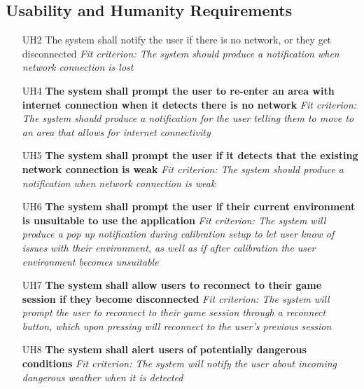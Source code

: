 \documentclass{article}
\begin{document}
\subsection{Usability and Humanity Requirements}
\begin{enumerate}
    \item[UH2] The system shall notify the user if there is no network, or they get disconnected\newline
    \textit{Fit criterion: The system should produce a notification when network connection is lost}
    \item[UH4] \textbf{The system shall prompt the user to re-enter an area with internet connection when it detects there is no network}\newline
    \textit{Fit criterion: The system should produce a notification for the user telling them to move to an area that allows for internet connectivity}
    \item[UH5] \textbf{The system shall prompt the user if it detects that the existing network connection is weak}\newline
    \textit{Fit criterion: The system should produce a notification when network connection is weak}
    \item[UH6] \textbf{The system shall prompt the user if their current environment is unsuitable to use the application}\newline
    \textit{Fit criterion: The system will produce a pop up notification during calibration setup to let user know of issues with their environment, as well as if after calibration the user environment becomes unsuitable}
    \item[UH7] \textbf{The system shall allow users to reconnect to their game session if they become disconnected}\newline
    \textit{Fit criterion: The system will prompt the user to reconnect to their game session through a reconnect button, which upon pressing will reconnect to the user's previous session}
    \item[UH8] \textbf{The system shall alert users of potentially dangerous conditions} \newline
    \textit{Fit criterion: The system will notify the user about incoming dangerous weather when it is detected}
\end{enumerate}

\end{document}
